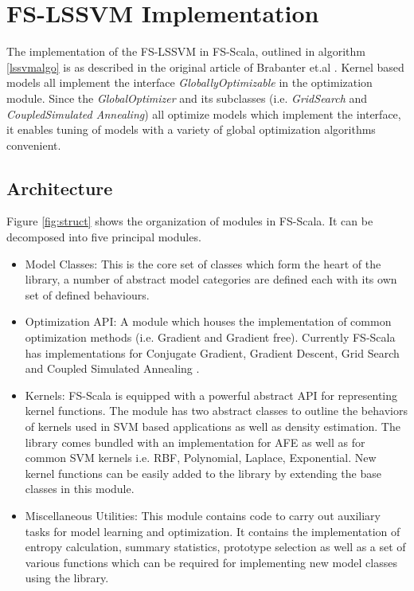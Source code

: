 \documentclass[conference, cmex10]{IEEEtran}
\begin{document}
\section{FS-LSSVM Implementation} \label{fsimpl}
The implementation of the FS-LSSVM in FS-Scala, outlined in algorithm \ref{lssvmalgo} is as described in the original article of Brabanter et.al \cite{DeBrabanter2010}. Kernel based models all implement the interface \textit{GloballyOptimizable} in the optimization module. Since the \textit{GlobalOptimizer} and its subclasses (i.e. \textit{GridSearch} and \textit{CoupledSimulated Annealing}) all optimize models which implement the  interface, it enables tuning of models with a variety of global optimization algorithms convenient.

\subsection*{Architecture} \label{archi}

Figure \ref{fig:struct} shows the organization of modules in FS-Scala. It can be decomposed into five principal modules.
\begin{itemize}
\item Model Classes:
This is the core set of classes which form the heart of the library, a number of abstract model categories are defined each with its own set of defined behaviours. 
\item Optimization API:
A module which houses the implementation of common optimization methods (i.e. Gradient and Gradient free). Currently FS-Scala has implementations for Conjugate Gradient, Gradient Descent, Grid Search and Coupled Simulated Annealing \cite{Xavier-De-Souza2010}. 
\item Kernels:
FS-Scala is equipped with a powerful abstract API for representing kernel functions. The module has two abstract classes to outline the behaviors of kernels used in SVM based applications as well as density estimation. The library comes bundled with an implementation for AFE as well as for common SVM kernels i.e. RBF, Polynomial, Laplace, Exponential. New kernel functions can be easily added to the library by extending the base classes in this module.

\item Miscellaneous Utilities:
This module contains code to carry out auxiliary tasks for model learning and optimization. It contains the implementation of entropy calculation, summary statistics, prototype selection as well as a set of various functions which can be required for implementing new model classes using the library.  

\end{itemize}
\end{document}
